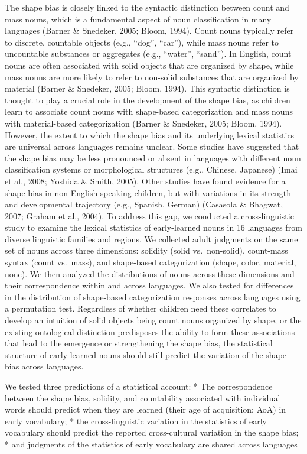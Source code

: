 \documentclass[
  english,
  man]{apa6}
\begin{document}
The shape bias is closely linked to the syntactic distinction between count and mass nouns, which is a fundamental aspect of noun classification in many languages (Barner \& Snedeker, 2005; Bloom, 1994). Count nouns typically refer to discrete, countable objects (e.g., ``dog'', ``car''), while mass nouns refer to uncountable substances or aggregates (e.g., ``water'', ``sand''). In English, count nouns are often associated with solid objects that are organized by shape, while mass nouns are more likely to refer to non-solid substances that are organized by material (Barner \& Snedeker, 2005; Bloom, 1994). This syntactic distinction is thought to play a crucial role in the development of the shape bias, as children learn to associate count nouns with shape-based categorization and mass nouns with material-based categorization (Barner \& Snedeker, 2005; Bloom, 1994).
However, the extent to which the shape bias and its underlying lexical statistics are universal across languages remains unclear. Some studies have suggested that the shape bias may be less pronounced or absent in languages with different noun classification systems or morphological structures (e.g., Chinese, Japanese) (Imai et al., 2008; Yoshida \& Smith, 2005). Other studies have found evidence for a shape bias in non-English-speaking children, but with variations in its strength and developmental trajectory (e.g., Spanish, German) (Casasola \& Bhagwat, 2007; Graham et al., 2004).
To address this gap, we conducted a cross-linguistic study to examine the lexical statistics of early-learned nouns in 16 languages from diverse linguistic families and regions. We collected adult judgments on the same set of nouns across three dimensions: solidity (solid vs.~non-solid), count-mass syntax (count vs.~mass), and shape-based categorization (shape, color, material, none). We then analyzed the distributions of nouns across these dimensions and their correspondence within and across languages. We also tested for differences in the distribution of shape-based categorization responses across languages using a permutation test.
Regardless of whether children need these correlates to develop an intuition of solid objects being count nouns organized by shape, or the existing ontological distinction predisposes the ability to form these associations that lead to the emergence or strengthening the shape bias, the statistical structure of early-learned nouns should still predict the variation of the shape bias across languages.

We tested three predictions of a statistical account:
* The correspondence between the shape bias, solidity, and countability associated with individual words should predict when they are learned (their age of acquisition; AoA) in early vocabulary;
* the cross-linguistic variation in the statistics of early vocabulary should predict the reported cross-cultural variation in the shape bias;
* and judgments of the statistics of early vocabulary are shared across languages
\end{document}
